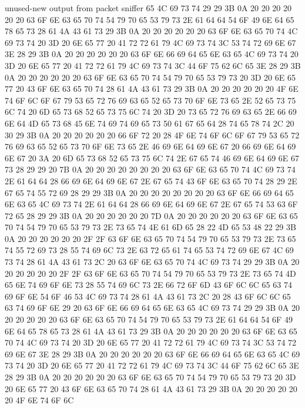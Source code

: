 \begin{chunk}{unused-new output from packet sniffer}
65 4C 69 73 74 29 29 3B 0A 20 20 20 20 20 20 63 6F 6E 63 65 70 74 54 79 70 
65 53 79 73 2E 61 64 64 54 6F 49 6E 64 65 78 65 73 28 61 4A 43 61 73 29 3B 
0A 20 20 20 20 20 20 63 6F 6E 63 65 70 74 4C 69 73 74 20 3D 20 6E 65 77 20 
41 72 72 61 79 4C 69 73 74 3C 53 74 72 69 6E 67 3E 28 29 3B 0A 20 20 20 20 
20 20 63 6F 6E 66 69 64 65 6E 63 65 4C 69 73 74 20 3D 20 6E 65 77 20 41 72 
72 61 79 4C 69 73 74 3C 44 6F 75 62 6C 65 3E 28 29 3B 0A 20 20 20 20 20 20 
63 6F 6E 63 65 70 74 54 79 70 65 53 79 73 20 3D 20 6E 65 77 20 43 6F 6E 63 
65 70 74 28 61 4A 43 61 73 29 3B 0A 20 20 20 20 20 20 4F 6E 74 6F 6C 6F 67 
79 53 65 72 76 69 63 65 52 65 73 70 6F 6E 73 65 2E 52 65 73 75 6C 74 20 6D 
65 73 68 52 65 73 75 6C 74 20 3D 20 73 65 72 76 69 63 65 2E 66 69 6E 64 4D 
65 73 68 45 6E 74 69 74 69 65 73 50 61 67 65 64 28 74 65 78 74 2C 20 30 29 
3B 0A 20 20 20 20 20 20 66 6F 72 20 28 4F 6E 74 6F 6C 6F 67 79 53 65 72 76 
69 63 65 52 65 73 70 6F 6E 73 65 2E 46 69 6E 64 69 6E 67 20 66 69 6E 64 69 
6E 67 20 3A 20 6D 65 73 68 52 65 73 75 6C 74 2E 67 65 74 46 69 6E 64 69 6E 
67 73 28 29 29 20 7B 0A 20 20 20 20 20 20 20 20 63 6F 6E 63 65 70 74 4C 69 
73 74 2E 61 64 64 28 66 69 6E 64 69 6E 67 2E 67 65 74 43 6F 6E 63 65 70 74 
28 29 2E 67 65 74 55 72 69 28 29 29 3B 0A 20 20 20 20 20 20 20 20 63 6F 6E 
66 69 64 65 6E 63 65 4C 69 73 74 2E 61 64 64 28 66 69 6E 64 69 6E 67 2E 67 
65 74 53 63 6F 72 65 28 29 29 3B 0A 20 20 20 20 20 20 7D 0A 20 20 20 20 20 
20 63 6F 6E 63 65 70 74 54 79 70 65 53 79 73 2E 73 65 74 4E 61 6D 65 28 22 
4D 65 53 48 22 29 3B 0A 20 20 20 20 20 20 2F 2F 63 6F 6E 63 65 70 74 54 79 
70 65 53 79 73 2E 73 65 74 55 72 69 73 28 55 74 69 6C 73 2E 63 72 65 61 74 
65 53 74 72 69 6E 67 4C 69 73 74 28 61 4A 43 61 73 2C 20 63 6F 6E 63 65 70 
74 4C 69 73 74 29 29 3B 0A 20 20 20 20 20 20 2F 2F 63 6F 6E 63 65 70 74 54 
79 70 65 53 79 73 2E 73 65 74 4D 65 6E 74 69 6F 6E 73 28 55 74 69 6C 73 2E 
66 72 6F 6D 43 6F 6C 6C 65 63 74 69 6F 6E 54 6F 46 53 4C 69 73 74 28 61 4A 
43 61 73 2C 20 28 43 6F 6C 6C 65 63 74 69 6F 6E 29 20 63 6F 6E 66 69 64 65 
6E 63 65 4C 69 73 74 29 29 3B 0A 20 20 20 20 20 20 63 6F 6E 63 65 70 74 54 
79 70 65 53 79 73 2E 61 64 64 54 6F 49 6E 64 65 78 65 73 28 61 4A 43 61 73 
29 3B 0A 20 20 20 20 20 20 63 6F 6E 63 65 70 74 4C 69 73 74 20 3D 20 6E 65 
77 20 41 72 72 61 79 4C 69 73 74 3C 53 74 72 69 6E 67 3E 28 29 3B 0A 20 20 
20 20 20 20 63 6F 6E 66 69 64 65 6E 63 65 4C 69 73 74 20 3D 20 6E 65 77 20 
41 72 72 61 79 4C 69 73 74 3C 44 6F 75 62 6C 65 3E 28 29 3B 0A 20 20 20 20 
20 20 63 6F 6E 63 65 70 74 54 79 70 65 53 79 73 20 3D 20 6E 65 77 20 43 6F 
6E 63 65 70 74 28 61 4A 43 61 73 29 3B 0A 20 20 20 20 20 20 4F 6E 74 6F 6C 

\end{chunk}
